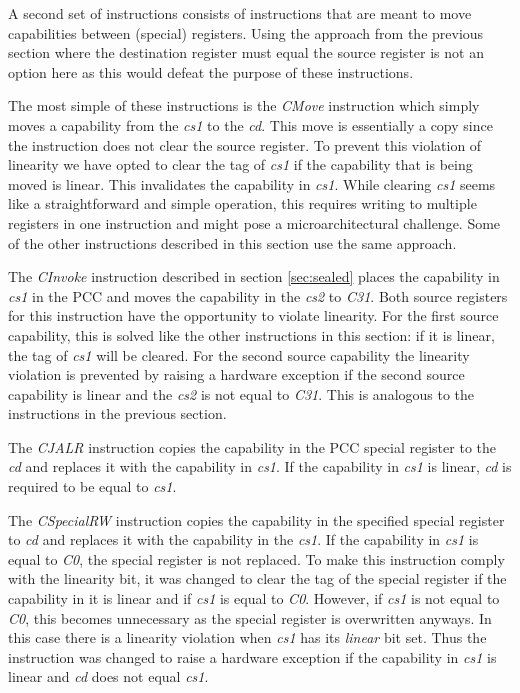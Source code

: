 A second set of instructions consists of instructions that are meant to move capabilities between (special) registers. Using the approach from the previous section where the destination register must equal the source register is not an option here as this would defeat the purpose of these instructions.

The most simple of these instructions is the \textit{CMove} instruction which simply moves a capability from the \textit{cs1} to the \textit{cd}. This move is essentially a copy since the instruction does not clear the source register. To prevent this violation of linearity we have opted to clear the tag of \textit{cs1} if the capability that is being moved is linear. This invalidates the capability in \textit{cs1}. While clearing  \textit{cs1} seems like a straightforward and simple operation, this requires writing to multiple registers in one instruction and might pose a microarchitectural challenge. Some of the other instructions described in this section use the same approach.

The \textit{CInvoke} instruction described in section \ref{sec:sealed} places the capability in \textit{cs1} in the PCC and moves the capability in the \textit{cs2} to \textit{C31}. Both source registers for this instruction have the opportunity to violate linearity. For the first source capability, this is solved like the other instructions in this section: if it is linear, the tag of \textit{cs1} will be cleared. For the second source capability the linearity violation is prevented by raising a hardware exception if the second source capability is linear and the \textit{cs2} is not equal to \textit{C31}. This is analogous to the instructions in the previous section.

The \textit{CJALR} instruction copies the capability in the PCC special register to the \textit{cd} and replaces it with the capability in \textit{cs1}. If the capability in \textit{cs1} is linear, \textit{cd} is required to be equal to \textit{cs1}.

The \textit{CSpecialRW} instruction copies the capability in the specified special register to \textit{cd} and replaces it with the capability in the \textit{cs1}. If the capability in \textit{cs1} is equal to \textit{C0}, the special register is not replaced. To make this instruction comply with the linearity bit, it was changed to clear the tag of the special register if the capability in it is linear and if \textit{cs1} is equal to \textit{C0}. However, if \textit{cs1} is not equal to \textit{C0}, this becomes unnecessary as the special register is overwritten anyways. In this case there is a linearity violation when \textit{cs1} has its \textit{linear} bit set. Thus the instruction was changed to raise a hardware exception if the capability in  \textit{cs1} is linear and \textit{cd} does not equal \textit{cs1}.

